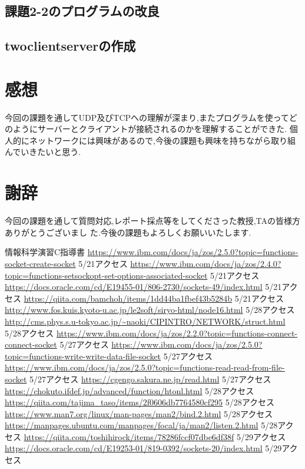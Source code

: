 \documentclass[dvipdfmx]{jarticle}
\begin{document}
\subsection{課題2-2のプログラムの改良}
\subsection{twoclientserverの作成}
\section{感想}
今回の課題を通してUDP及びTCPへの理解が深まり,またプログラムを使ってどのようにサーバーとクライアントが接続されるのかを理解することができた.
個人的にネットワークには興味があるので,今後の課題も興味を持ちながら取り組んでいきたいと思う.
\section{謝辞}
今回の課題を通して質問対応,レポート採点等をしてくださった教授,TAの皆様方ありがとうございまし
た.今後の課題もよろしくお願いいたします.
\begin{thebibliography}{99}
    情報科学演習C指導書
     \url{https://www.ibm.com/docs/ja/zos/2.5.0?topic=functions-socket-create-socket} 5/21アクセス
     \url{https://www.ibm.com/docs/ja/zos/2.4.0?topic=functions-setsockopt-set-options-associated-socket} 5/21アクセス
     \url{https://docs.oracle.com/cd/E19455-01/806-2730/sockets-49/index.html} 5/21アクセス
     \url{https://qiita.com/bamchoh/items/1dd44ba1fbef43b5284b} 5/21アクセス
     \url{http://www.fos.kuis.kyoto-u.ac.jp/le2soft/siryo-html/node16.html} 5/28アクセス
     \url{http://cms.phys.s.u-tokyo.ac.jp/~naoki/CIPINTRO/NETWORK/struct.html} 5/28アクセス
     \url{https://www.ibm.com/docs/ja/zos/2.2.0?topic=functions-connect-connect-socket} 5/27アクセス
     \url{https://www.ibm.com/docs/ja/zos/2.5.0?topic=functions-write-write-data-file-socket} 5/27アクセス
     \url{https://www.ibm.com/docs/ja/zos/2.5.0?topic=functions-read-read-from-file-socket} 5/27アクセス
     \url{https://cgengo.sakura.ne.jp/read.html} 5/27アクセス
     \url{https://chokuto.ifdef.jp/advanced/function/htonl.html} 5/28アクセス
     \url{https://qiita.com/tajima_taso/items/2f0606db7764580cf295} 5/28アクセス
     \url{https://www.man7.org/linux/man-pages/man2/bind.2.html} 5/28アクセス
     \url{https://manpages.ubuntu.com/manpages/focal/ja/man2/listen.2.html} 5/28アクセス
     \url{https://qiita.com/toshihirock/items/78286fccf07dbe6df38f} 5/29アクセス
     \url{https://docs.oracle.com/cd/E19253-01/819-0392/sockets-20/index.html} 5/29アクセス
\end{thebibliography}
\end{document}
